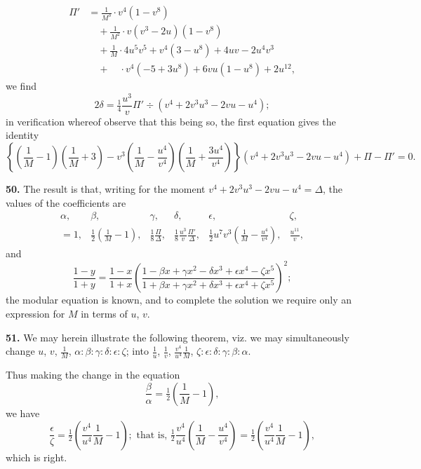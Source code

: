 \documentclass[11pt,a4paper]{book}
\begin{document}
\begin{align*}
\Pi' &= \frac{1}{M^3} \cdot v^4(1 - v^8) \\
&\quad + \frac{1}{M^2} \cdot v(v^3 - 2u)(1 - v^8) \\
&\quad + \frac{1}{M} \cdot 4u^5 v^5 + v^4(3 - u^8) + 4uv - 2u^4 v^3 \\
&\quad + \quad \cdot v^4(-5 + 3u^8) + 6vu(1 - u^8) + 2u^{12},
\end{align*}
we find
\[
2\delta = \tfrac{1}{4}\frac{u^3}{v}\Pi' \div (v^4 + 2v^3 u^3 - 2vu - u^4);
\]
in verification whereof observe that this being so, the first equation gives the identity
\[
\left\{\left(\frac{1}{M} - 1\right)\left(\frac{1}{M} + 3\right)
- v^3\left(\frac{1}{M} - \frac{u^4}{v^4}\right)\left(\frac{1}{M} + \frac{3u^4}{v^4}\right)\right\}
(v^4 + 2v^3 u^3 - 2vu - u^4) + \Pi - \Pi' = 0.
\]

\textbf{50.} The result is that, writing for the moment $v^4 + 2v^3 u^3 - 2vu - u^4 = \Delta$, the values of the coefficients are
\[
\begin{array}{cccccc}
\alpha, & \beta, & \gamma, & \delta, & \epsilon, & \zeta, \\
= 1, & \frac{1}{2}\left(\frac{1}{M} - 1\right), & \frac{1}{8}\frac{\Pi}{\Delta}, &
\frac{1}{8}\frac{u^3}{v}\frac{\Pi'}{\Delta}, &
\frac{1}{2}u^7 v^3\left(\frac{1}{M} - \frac{u^4}{v^4}\right), & \frac{u^{11}}{v},
\end{array}
\]
and
\[
\frac{1 - y}{1 + y} = \frac{1 - x}{1 + x}
\left(\frac{1 - \beta x + \gamma x^2 - \delta x^3 + \epsilon x^4 - \zeta x^5}
{1 + \beta x + \gamma x^2 + \delta x^3 + \epsilon x^4 + \zeta x^5}\right)^2;
\]
the modular equation is known, and to complete the solution we require only an expression for $M$ in terms of $u$, $v$.

\textbf{51.} We may herein illustrate the following theorem, viz. we may simultaneously change $u$, $v$, $\frac{1}{M}$, $\alpha : \beta : \gamma : \delta : \epsilon : \zeta$; into $\frac{1}{u}$, $\frac{1}{v}$, $\frac{v^4}{u^4}\frac{1}{M}$, $\zeta : \epsilon : \delta : \gamma : \beta : \alpha$.

Thus making the change in the equation
\[
\frac{\beta}{\alpha} = \tfrac{1}{2}\left(\frac{1}{M} - 1\right),
\]
we have
\[
\frac{\epsilon}{\zeta} = \tfrac{1}{2}\left(\frac{v^4}{u^4}\frac{1}{M} - 1\right);
\text{ that is, } \tfrac{1}{2}\frac{v^4}{u^4}\left(\frac{1}{M} - \frac{u^4}{v^4}\right)
= \tfrac{1}{2}\left(\frac{v^4}{u^4}\frac{1}{M} - 1\right),
\]
which is right.
\end{document}
